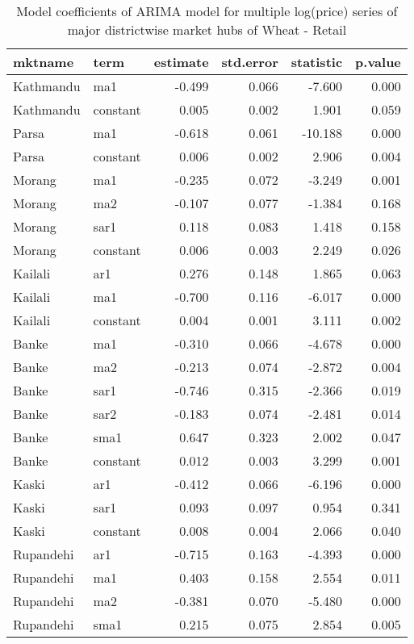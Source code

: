 \documentclass[12pt,]{article}
\begin{document}
\begin{table}

\caption{\label{tab:multiple-arima-summary}Model coefficients of ARIMA model for multiple log(price) series of major districtwise market hubs of Wheat - Retail}
\centering
\begin{tabular}[t]{llrrrr}
\toprule
mktname & term & estimate & std.error & statistic & p.value\\
\midrule
Kathmandu & ma1 & -0.499 & 0.066 & -7.600 & 0.000\\
Kathmandu & constant & 0.005 & 0.002 & 1.901 & 0.059\\
Parsa & ma1 & -0.618 & 0.061 & -10.188 & 0.000\\
Parsa & constant & 0.006 & 0.002 & 2.906 & 0.004\\
Morang & ma1 & -0.235 & 0.072 & -3.249 & 0.001\\
\addlinespace
Morang & ma2 & -0.107 & 0.077 & -1.384 & 0.168\\
Morang & sar1 & 0.118 & 0.083 & 1.418 & 0.158\\
Morang & constant & 0.006 & 0.003 & 2.249 & 0.026\\
Kailali & ar1 & 0.276 & 0.148 & 1.865 & 0.063\\
Kailali & ma1 & -0.700 & 0.116 & -6.017 & 0.000\\
\addlinespace
Kailali & constant & 0.004 & 0.001 & 3.111 & 0.002\\
Banke & ma1 & -0.310 & 0.066 & -4.678 & 0.000\\
Banke & ma2 & -0.213 & 0.074 & -2.872 & 0.004\\
Banke & sar1 & -0.746 & 0.315 & -2.366 & 0.019\\
Banke & sar2 & -0.183 & 0.074 & -2.481 & 0.014\\
\addlinespace
Banke & sma1 & 0.647 & 0.323 & 2.002 & 0.047\\
Banke & constant & 0.012 & 0.003 & 3.299 & 0.001\\
Kaski & ar1 & -0.412 & 0.066 & -6.196 & 0.000\\
Kaski & sar1 & 0.093 & 0.097 & 0.954 & 0.341\\
Kaski & constant & 0.008 & 0.004 & 2.066 & 0.040\\
\addlinespace
Rupandehi & ar1 & -0.715 & 0.163 & -4.393 & 0.000\\
Rupandehi & ma1 & 0.403 & 0.158 & 2.554 & 0.011\\
Rupandehi & ma2 & -0.381 & 0.070 & -5.480 & 0.000\\
Rupandehi & sma1 & 0.215 & 0.075 & 2.854 & 0.005\\
\bottomrule
\end{tabular}
\end{table}
\end{document}

